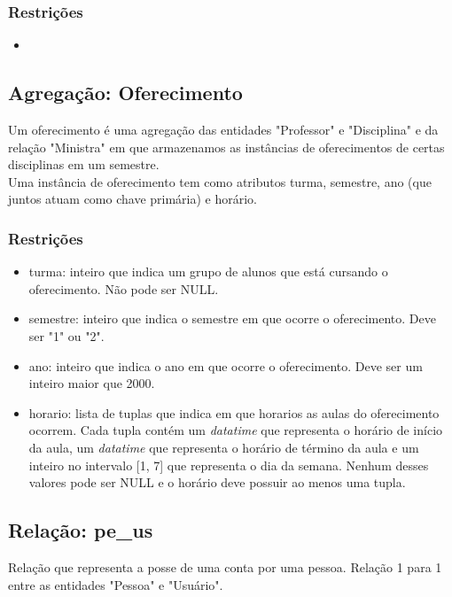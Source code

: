 \documentclass{article}
\begin{document}
  	    \subsubsection{Restrições}
  	        \begin{itemize}
  		        \item 
  		    \end{itemize}
  		    
  	\subsection{Agregação: Oferecimento}
  	    \quad Um oferecimento é uma agregação das entidades "Professor" e "Disciplina" e da relação "Ministra" em que armazenamos as instâncias de oferecimentos de certas disciplinas em um semestre. \\
  	    \quad Uma instância de oferecimento tem como atributos turma, semestre, ano (que juntos atuam como chave primária) e horário. 
  	    \subsubsection{Restrições}
  	        \begin{itemize}
  	            \item turma: inteiro que indica um grupo de alunos que está cursando o oferecimento. Não pode ser NULL.
  	            \item semestre: inteiro que indica o semestre em que ocorre o oferecimento. Deve ser "1" ou "2".
  	            \item ano: inteiro que indica o ano em que ocorre o oferecimento. Deve ser um inteiro maior que 2000.
  	            \item horario: lista de tuplas que indica em que horarios as aulas do oferecimento ocorrem. Cada tupla contém um \textit{datatime} que representa o horário de início da aula, um \textit{datatime} que representa o horário de término da aula e um inteiro no intervalo [1, 7] que representa o dia da semana. Nenhum desses valores pode ser NULL e o horário deve possuir ao menos uma tupla.
  	         \end{itemize}
  	    
  	\subsection{Relação: pe\_us}
  	    \quad Relação que representa a posse de uma conta por uma pessoa. Relação 1 para 1 entre as entidades "Pessoa" e "Usuário".
  	    
\end{document}
